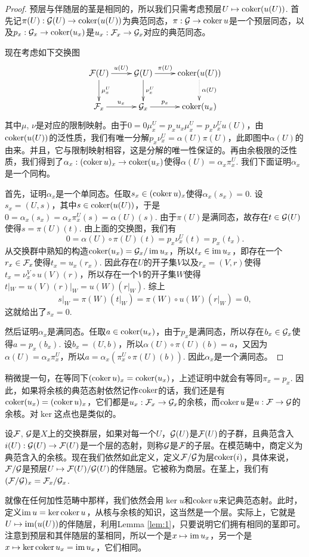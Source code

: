 \begin{proof}
预层与伴随层的茎是相同的，所以我们只需考虑预层$U\mapsto \operatorname{coker}(u(U))$. 首先记$\pi(U):\mathcal{G}(U)\to \operatorname{coker} (u(U))$为典范同态，$\pi:\mathcal{G}\to \operatorname{coker} u$是一个预层同态，以及$p_x:\mathcal{G}_x\to \operatorname{coker}(u_x)$是$u_x:\mathcal{F}_x\to\mathcal{G}_x$对应的典范同态。

现在考虑如下交换图
\[
	\xymatrix{
	\calf(U)\ar[r]^{u(U)}\ar[d]^{\mu^U_x}&\calg(U)\ar[r]^-{\pi(U)}\ar[d]^{\nu^U_x}&\coker (u(U))\ar@{.>}[d]^{\alpha(U)}\\
	\calf_x\ar[r]^{u_x}&\calg_x\ar[r]^-{p_x}&\coker (u_x)
	}
\]
其中$\mu$, $\nu$是对应的限制映射。由于$0=0\mu^U_x=p_xu_x\mu^U_x=p_x\nu^U_xu(U)$，由$\operatorname{coker}(u(U))$的泛性质，我们有唯一分解$p_x\nu^U_x=\alpha(U)\pi(U)$，此即图中$\alpha(U)$的由来。并且，它与限制映射相容，这是分解的唯一性保证的。再由余极限的泛性质，我们得到了$\alpha_x:(\operatorname{coker} u)_x\to \operatorname{coker} (u_x)$使得$\alpha(U)=\alpha_x\pi^U_x$. 我们下面证明$\alpha_x$是一个同构。

首先，证明$\alpha_x$是一个单同态。任取$s_x\in (\operatorname{coker} u)_x$使得$\alpha_x(s_x)=0$. 设$s_x=(U,s)$，其中$s\in \operatorname{coker} (u(U))$，于是$0=\alpha_x(s_x)=\alpha_x \pi_x^U(s)=\alpha(U)(s)$. 由于$\pi(U)$是满同态，故存在$t\in \mathcal{G}(U)$使得$s=\pi(U)(t)$. 由上面的交换图，我们有
\[
	0=\alpha(U)\circ \pi(U)(t)=p_x\nu_x^U(t)=p_x(t_x).
\]
从交换群中熟知的构造$\operatorname{coker}(u_x)=\mathcal{G}_x/\operatorname{im} u_x$，所以$t_x\in \operatorname{im} u_x$，即存在一个$r_x\in \mathcal{F}_x$使得$t_x=u_x(r_x)$. 因此存在$U$的开子集$V$以及$r_x=(V,r)$使得$t_x=\nu_x^V\circ u(V)(r)$，所以存在一个$V$的开子集$W$使得$t|_W=u(V)(r)|_W=u(W)(r|_W)$. 综上
\[
	s|_W=\pi(W)(t|_W)=\pi(W)\circ u(W)(r|_W)=0,
\]
这就给出了$s_x=0$.

然后证明$\alpha_x$是满同态。任取$a\in \operatorname{coker}(u_x)$，由于$p_x$是满同态，所以存在$b_x\in\mathcal{G}_x$使得$a=p_x(b_x)$. 设$b_x=(U,b)$，所以$\alpha(U)\circ \pi(U)(b)=a$，又因为$\alpha(U)=\alpha_x\pi^U_x$，所以$a=\alpha_x\left(\pi^U_x\circ \pi(U)(b)\right)$. 因此$\alpha_x$是一个满同态。
\end{proof}

稍微提一句，在等同下$(\operatorname{coker} u)_x=\operatorname{coker}(u_x)$，上述证明中就会有等同$\pi_x=p_x$. 因此，如果将余核的典范态射依然记作$\operatorname{coker}$的话，我们还是有$\operatorname{coker}(u_x)=(\operatorname{coker} u)_x$，它们都是$u_x:\mathcal{F}_x\to\mathcal{G}_x$的余核，而$\operatorname{coker} u$是$u:\mathcal{F} \to \mathcal{G}$的余核。对$\ker$这点也是类似的。

\begin{para}
设$\mathcal{F}$, $\mathcal{G}$是$X$上的交换群层，如果对每一个$U$，$\mathcal{G}(U)$是$\mathcal{F}(U)$的子群，且典范含入$i(U):\mathcal{G}(U)\to\mathcal{F}(U)$是一个层的态射，则称$\mathcal{G}$是$\mathcal{F}$的子层。在模范畴中，商定义为典范含入的余核。现在我们依然如此定义，定义$\mathcal{F}/\mathcal{G}$为层$\operatorname{coker}(i)$，具体来说，$\mathcal{F}/\mathcal{G}$是预层$U\mapsto \mathcal{F}(U)/\mathcal{G}(U)$的伴随层。它被称为商层。在茎上，我们有$(\mathcal{F}/\mathcal{G})_x=\mathcal{F}_x/\mathcal{G}_x$.

就像在任何加性范畴中那样，我们依然会用$\ker u$和$\operatorname{coker} u$来记典范态射。此时，定义$\operatorname{im} u=\ker\operatorname{coker} u$，从核与余核的知识，这当然是一个层。实际上，它就是$U\mapsto \operatorname{im}(u(U))$的伴随层，利用Lemma \ref{lem:1}，只要说明它们拥有相同的茎即可。注意到预层和其伴随层的茎相同，所以一个是$x\mapsto \operatorname{im} u_x$，另一个是$x\mapsto \ker\operatorname{coker} u_x=\operatorname{im} u_x$，它们相同。
\end{para}

